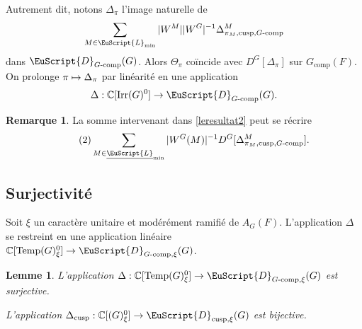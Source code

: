\documentclass[JEP,XML,SOM,Unicode,francais]{cedram}
\let\mathcal \EuScript
\let\oldenumerate\enumerate
\renewcommand{\enumerate}{\oldenumerate\itemindent0pt}
\newenvironment{enumeratei}
{\bgroup\def\theenumi{\roman{enumi}}\def\theenumii{\arabic{enumii}}\oldenumerate}
{\endenumerate\egroup}
\newcommand{\NoChangel}[1]{%
\expandafter\let\csname old\string#1\endcsname=#1
\let#1=\relax
\newcommand{#1}{\mathcode`l="716C\csname old\string#1\endcsname\mathcode`l="7160 }%
}
\newcommand\mto{\mathchoice{\longmapsto}{\mapsto}{\mapsto}{\mapsto}}
\newcommand{\comp}{\mathrm{comp}}
\newcommand{\tcomp}{\textup{-comp}}
\newcommand{\cusp}{\mathrm{cusp}}
\newcommand{\Ell}{\mathrm{Ell}} \NoChangel{\Ell}
\newcommand{\Irr}{\mathrm{Irr}}
\newcommand{\Temp}{\mathrm{Temp}}
\newcommand{\cD}{\mathcal{D}}
\newcommand{\cL}{\mathcal{L}}
\newcommand{\CC}{\mathbb{C}}
\theoremstyle{plain}
\newtheorem*{lem*}{Lemme}
\theoremstyle{definition}
\newtheorem*{rem*}{Remarque}
\begin{document}
Autrement dit, notons $\Delta_{\pi}$ l'image naturelle de
\[
\sum_{M\in \cL_{\min}}\vert W^M\vert \vert W^G\vert ^{-1}\Delta^M_{\pi_{M},\cusp,G\tcomp}
\]
dans $\cD_{G\tcomp}(G)$. Alors $\Theta_{\pi}$ coïncide avec $D^G[\Delta_{\pi}]$ sur $G_{\comp}(F)$. On prolonge $\pi\mto \Delta_{\pi}$ par linéarité en une application
\[
\Delta:\CC[\Irr(G)^0]\to \cD_{G\tcomp}(G).
\]

\begin{rem*}
La somme intervenant dans \eqref{leresultat2} peut se récrire
\begin{equation}\tag{2}\label{leresultat2}
\sum_{M\in \underline{\cL}_{\min}}\vert W^G(M)\vert ^{-1}D^G[\Delta^M_{\pi_{M},\cusp,G\tcomp}].
\end{equation}
\end{rem*}

\subsection{Surjectivité}\label{surjectivite}

Soit $\xi$ un caractère unitaire et modérément ramifié de $A_{G}(F)$. L'application $\Delta$ se restreint en une application linéaire $\CC[\Temp(G)_{\xi}^0]\to \cD_{G\tcomp,\xi}(G)$.

\skpt
\begin{lem*}
\begin{enumeratei}
\item\label{surjectivitei}
L'application $\Delta:\CC[\Temp(G)_{\xi}^0]\to \cD_{G\tcomp,\xi}(G)$ est surjective.

\item\label{surjectiviteii}
L'application $\Delta_{\cusp}:\CC[\Ell(G)_{\xi}^0]\to \cD_{\cusp,\xi}(G)$ est bijective.
\end{enumeratei}
\end{lem*}
\end{document}
